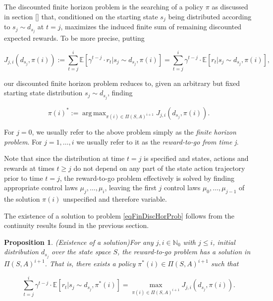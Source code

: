 \documentclass[11pt]{article} %
\newtheorem{prop}{Proposition}
\DeclareMathOperator*{\argmax}{arg\,max}
\begin{document}
The discounted finite horizon problem is the searching of a policy $\pi$ as discussed in section \ref{} that, conditioned on the starting state $s_j$ being distributed according to $s_j \sim d_{s_j}$ at $t=j$, maximizes the induced finite sum of remaining discounted expected rewards. To be more precise, putting

\begin{equation}\label{eqFinDiscHorReward}
		J_{j,i}(d_{s_j},\pi(i)) := \sum\limits_{t=j}^i \mathbb{E}[ \gamma^{t-j} \cdot r_t | s_j \sim d_{s_j}, \pi(i)] = \sum\limits_{t=j}^i \gamma^{t-j} \cdot \mathbb{E}[ r_t | s_j \sim d_{s_j}, \pi(i)],
\end{equation}

our discounted finite horizon problem reduces to, given an arbitrary but fixed starting state distribution $s_j \sim d_{s_j}$, finding

\begin{equation}\label{eqFinDiscHorProb}
	\pi(i)^* := \argmax_{\pi(i) \in \Pi(S,A)^{i+1}} J_{j,i}(d_{s_j},\pi(i)).
\end{equation}

For $j=0$, we usually refer to the above problem simply as the \textit{finite horizon problem}. For $j = 1,\dots,i$ we usually refer to it as the \textit{reward-to-go from time j}. 

Note that since the distribution at time $t = j$ is specified and states, actions and  rewards at times $t \ge j$ do not depend on any part of the state action trajectory prior to time $t = j$, the reward-to-go problem effectively is solved by finding appropriate control laws $\mu_j,\dots,\mu_i$, leaving the first $j$ control laws $\mu_0,\dots,\mu_{j-1}$ of the solution $\pi(i)$ unspecified and therefore variable.

The existence of a solution to problem \ref{eqFinDiscHorProb} follows from the continuity results found in the previous section.

\begin{prop}(Existence of a solution)\label{propExistenceFiniteSolution}
	For any $j,i \in \mathbb{N}_0$ with $j \le i$, initial distribution $d_{s_j}$ over the state space $S$, the reward-to-go problem has a solution in $\Pi(S,A)^{i+1}$. That is, there exists a policy $\pi^*(i) \in \Pi(S,A)^{i+1}$ such that

\begin{equation}
	\sum\limits_{t=j}^i \gamma^{t-j} \cdot \mathbb{E}[ r_t | s_j \sim d_{s_j}, \pi^*(i)] = \max_{\pi(i) \in \Pi(S,A)^{i+1}} J_{j,i}(d_{s_j},\pi(i)).
\end{equation}

\end{prop}
\end{document}
